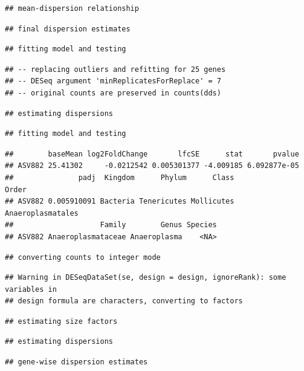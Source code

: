\documentclass[]{article}
\begin{document}
\begin{verbatim}
## mean-dispersion relationship
\end{verbatim}

\begin{verbatim}
## final dispersion estimates
\end{verbatim}

\begin{verbatim}
## fitting model and testing
\end{verbatim}

\begin{verbatim}
## -- replacing outliers and refitting for 25 genes
## -- DESeq argument 'minReplicatesForReplace' = 7 
## -- original counts are preserved in counts(dds)
\end{verbatim}

\begin{verbatim}
## estimating dispersions
\end{verbatim}

\begin{verbatim}
## fitting model and testing
\end{verbatim}

\begin{verbatim}
##        baseMean log2FoldChange       lfcSE      stat       pvalue
## ASV882 25.41302     -0.0212542 0.005301377 -4.009185 6.092877e-05
##               padj  Kingdom      Phylum      Class             Order
## ASV882 0.005910091 Bacteria Tenericutes Mollicutes Anaeroplasmatales
##                    Family        Genus Species
## ASV882 Anaeroplasmataceae Anaeroplasma    <NA>
\end{verbatim}

\begin{verbatim}
## converting counts to integer mode
\end{verbatim}

\begin{verbatim}
## Warning in DESeqDataSet(se, design = design, ignoreRank): some variables in
## design formula are characters, converting to factors
\end{verbatim}

\begin{verbatim}
## estimating size factors
\end{verbatim}

\begin{verbatim}
## estimating dispersions
\end{verbatim}

\begin{verbatim}
## gene-wise dispersion estimates
\end{verbatim}
\end{document}
